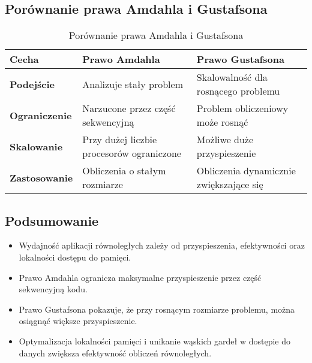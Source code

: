 \subsection{Porównanie prawa Amdahla i Gustafsona}

\begin{table}[h]
    \centering
    \renewcommand{\arraystretch}{1.3} %
    \begin{tabularx}{\textwidth}{|l|X|X|}
        \hline
        \textbf{Cecha} & \textbf{Prawo Amdahla} & \textbf{Prawo Gustafsona} \\
        \hline
        \textbf{Podejście} & Analizuje stały problem & Skalowalność dla rosnącego problemu \\
        \hline
        \textbf{Ograniczenie} & Narzucone przez część sekwencyjną & Problem obliczeniowy może rosnąć \\
        \hline
        \textbf{Skalowanie} & Przy dużej liczbie procesorów ograniczone & Możliwe duże przyspieszenie \\
        \hline
        \textbf{Zastosowanie} & Obliczenia o stałym rozmiarze & Obliczenia dynamicznie zwiększające się \\
        \hline
    \end{tabularx}
    \caption{Porównanie prawa Amdahla i Gustafsona}
\end{table}


\subsection{Podsumowanie}
\begin{itemize}
    \item Wydajność aplikacji równoległych zależy od przyspieszenia, efektywności oraz lokalności dostępu do pamięci.
    \item Prawo Amdahla ogranicza maksymalne przyspieszenie przez część sekwencyjną kodu.
    \item Prawo Gustafsona pokazuje, że przy rosnącym rozmiarze problemu, można osiągnąć większe przyspieszenie.
    \item Optymalizacja lokalności pamięci i unikanie wąskich gardeł w dostępie do danych zwiększa efektywność obliczeń równoległych.
\end{itemize}
